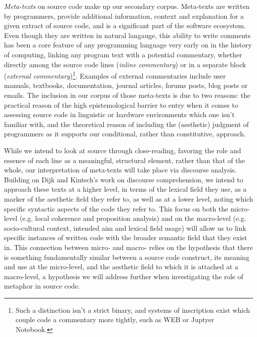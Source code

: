 \emph{Meta-texts} on source code make up our secondary corpus. Meta-texts are written by programmers, provide additional information, context and explanation for a given extract of source code, and is a significant part of the software ecosystem. Even though they are written in natural langauge, this ability to write comments has been a core feature of any programming language very early on in the history of computing, linking any program text with a potential commentary, whether directly among the source code lines (\emph{inline commentary}) or in a separate block (\emph{external commentary})\footnote{Such a distinction isn't a strict binary, and systems of inscription exist which couple code a commentary more tightly, such as WEB or Juptyer Notebook.}. Examples of external commentaries include user manuals, textbooks, documentation, journal articles, forums posts, blog posts or emails. The inclusion in our corpus of those meta-texts is due to two reasons: the practical reason of the high epistemological barrier to entry when it comes to assessing source code in linguistic or hardware environments which one isn't familiar with, and the theoretical reason of including the (aesthetic) judgment of programmers as it supports our conditional, rather than constitutive, approach.

While we intend to look at source through close-reading, favoring the role and essence of each line as a meaningful, structural element, rather than that of the whole, our interpretation of meta-texts will take place via discourse analysis. Building on Dijk and Kintsch's work on discourse comprehension\cite{dijk_strategies_1983}, we intend to approach these texts at a higher level, in terms of the lexical field they use, as a marker of the aesthetic field they refer to, as well as at a lower level, noting which specific syntactic aspects of the code they refer to. This focus on both the micro-level (e.g. local coherence and proposition analysis) and on the macro-level (e.g. socio-cultural context, intended aim and  lexical field usage) will allow us to link specific instances of written code with the broader semantic field that they exist in. This connection between micro- and macro- relies on the hypothesis that there is something fundamentally similar between a source code construct, its meaning and use at the micro-level, and the aesthetic field to which it is attached at a macro-level, a hypothesis we will address further when investigating the role of metaphor in source code.

